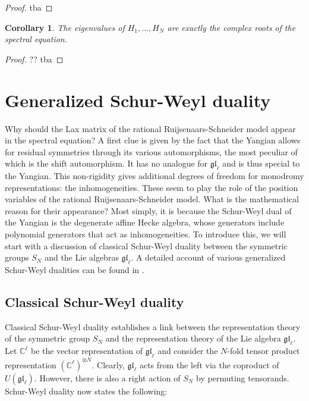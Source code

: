 \documentclass[11pt]{report}
\newtheorem{corollary}[theorem]{Corollary}
\theoremstyle{definition}
\theoremstyle{remark}
\theoremstyle{remark}
\newcommand{\C}{\mathbb{C}}
\begin{document}
\begin{proof}
tba
\end{proof}

\begin{corollary}
The eigenvalues of $H_1,...,H_N$ are exactly the complex roots of the spectral equation.
\end{corollary}

\begin{proof}
?? tba
\end{proof}

\section{Generalized Schur-Weyl duality}

Why should the Lax matrix of the rational Ruijsenaars-Schneider model appear in the spectral equation? A first clue is given by the fact that the Yangian allows for residual symmetries through its various automorphisms, the most peculiar of which is the shift automorphism. It has no analogue for $\mathfrak{gl}_\ell$ and is thus special to the Yangian. This non-rigidity gives additional degrees of freedom for monodromy representations: the inhomogeneities. These seem to play the role of the position variables of the rational Ruijsenaars-Schneider model. What is the mathematical reason for their appearance? Most simply, it is because the Schur-Weyl dual of the Yangian is the degenerate affine Hecke algebra, whose generators include polynomial generators that act as inhomogeneities. To introduce this, we will start with a discussion of classical Schur-Weyl duality between the symmetric groups $S_N$ and the Lie algebras $\mathfrak{gl}_\ell$. A detailed account of various generalized Schur-Weyl dualities can be found in \cite{thesis:antor:2020}.

\subsection{Classical Schur-Weyl duality}

Classical Schur-Weyl duality establishes a link between the representation theory of the symmetric group $S_N$ and the representation theory of the Lie algebra $\mathfrak{gl}_\ell$. Let $\C^\ell$ be the vector representation of $\mathfrak{gl}_\ell$ and consider the $N$-fold tensor product representation $(\C^\ell)^{\otimes N}$. Clearly, $\mathfrak{gl}_\ell$ acts from the left via the coproduct of $U(\mathfrak{gl}_\ell)$. However, there is also a right action of $S_N$ by permuting tensorands. Schur-Weyl duality now states the following:
\end{document}
